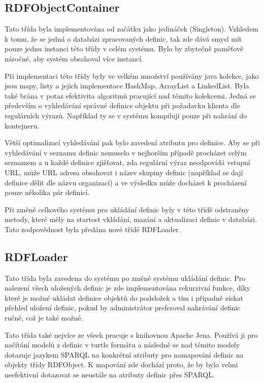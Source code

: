 \documentclass[thesis=B,czech]{FITthesis}[2012/06/26]
\begin{document}
  \subsection{RDFObjectContainer}\label{rdf_object_container}
  Tato třída byla implementována od začátku jako jedináček (Singleton). Vzhledem k tomu, že se jedná o databázi zpracovaných definic, tak zde dává smysl mít pouze
  jednu instanci této třídy v celém systému. Bylo by zbytečně paměťově náročné, aby systém obsahoval více instancí.
  
  Při implementaci této třídy byly ve velkém množství používány java kolekce, jako jsou mapy, listy a jejich implementace HashMap, ArrayList a LinkedList.
  Byla také brána v potaz efektivita algoritmů pracující nad těmito kolekcemi. Jedná se především o vyhledávání správné definice objektu při požadavku klienta
  dle regulárních výrazů. Například ty se v systému kompilují pouze při nahrání do kontejneru.
  
  Větší optimalizací vyhledávání pak bylo zavedení atributu  pro definice. Aby se při vyhledávání v seznamu definic nemuselo v nejhorším případě 
  procházet celým seznamem a u každé definice zjišťovat, zda regulární výraz neodpovídá vstupní URL, může URL adresa obsahovat i název skupiny definic (například
  se dají definice dělit dle názvu organizací) a ve výsledku může docházet k procházení pouze několika pár definicí.
    
  Při změně celkového systému pro ukládání definic byly v této třídě odstraněny metody, které měly na startost vkládání, 
  mazání a aktualizaci definic v databázi. Tato zodpovědnost byla předána nové třídě RDFLoader.	
  
  \subsection{RDFLoader}
  Tato třída byla zavedena do systému po změně systému ukládání definic. Pro nalezení všech uložených definic je zde implementována rekurzivní funkce, 
  díky které je možné ukládat definice objektů do podsložek a tím i případně získat přehled uložení definic, pokud by administrátor preferoval nahrávání definic
  ručně, což je také možné.
  
  Tato třída také nejvíce ze všech pracuje s knihovnou Apache Jena. Používá ji pro načítání modelů z definic v turtle formátu a následně se nad těmito
  modely dotazuje jazykem SPARQL na konkrétní atributy pro namapování definic na objekty třídy RDFObject. K mapování zde dochází proto, že by bylo velmi neefektivní
  dotazovat se neustále na atributy definic přes SPARQL.
  
\end{document}
